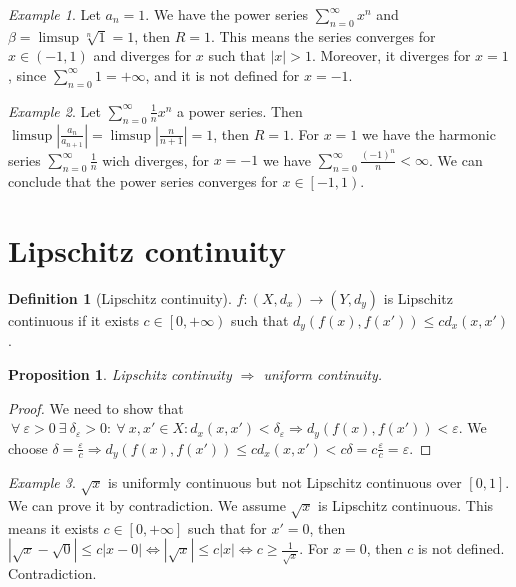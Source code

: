 \documentclass{article}
\newcommand{\DS}{\displaystyle}
\newcommand{\abs}[1]{\left|#1\right|}
\newcommand{\Ar}{\Rightarrow}
\newcommand{\f}[3]{#1 : #2 \rightarrow #3}
\newcommand{\intcc}[1]{\left[#1\right]}
\newcommand{\intco}[1]{\left[#1\right)}
\newcommand{\intoo}[1]{\left(#1\right)}
\theoremstyle{definition}
\newtheorem{definition}{Definition}[section]
\theoremstyle{definition}
\theoremstyle{plain}
\theoremstyle{plain}
\theoremstyle{plain}
\theoremstyle{plain}
\newtheorem{proposition}[theorem]{Proposition}
\theoremstyle{definition}
\theoremstyle{remark}
\theoremstyle{remark}
\theoremstyle{remark}
\newtheorem{examplet}{Example}[theorem]
\theoremstyle{remark}
\newcommand{\pseries}[1]{\sum_{n=0}^\infty #1}
\newcommand{\ForAll}{\ \forall \ }
\newcommand{\Exists}{\ \exists \ }
\newcommand{\E}{\varepsilon}
\begin{document}
\begin{examplet}
  Let $a_n = 1$. We have the power series $\DS \pseries{x^n}$ and $\beta = \limsup \sqrt[n]{1} = 1$, then $R = 1$. This means the series converges for $x \in \intoo{-1,1}$ and diverges for $x$ such that $|x| > 1$. Moreover, it diverges for $x = 1$, since $\DS \pseries{1} = +\infty$, and it is not defined for $x = -1$.
\end{examplet}

\begin{examplet}
  Let $\DS \pseries{\frac{1}{n}x^n}$ a power series. Then $\limsup \abs{\frac{a_n}{a_{n+1}}} = \limsup \abs{\frac{n}{n+1}} = 1$, then $R = 1$. For $x = 1$ we have the harmonic series $\DS \pseries{\frac{1}{n}}$ wich diverges, for $x = -1$ we have $\DS \pseries{\frac{(-1)^n}{n}} < \infty$. We can conclude that the power series converges for $x \in \intco{-1,1}$.
\end{examplet}


\newpage
\section{Lipschitz continuity}


\begin{definition}[Lipschitz continuity]
  $\f{f}{(X,d_x)}{(Y,d_y)}$ is Lipschitz continuous if it exists $c \in \intco{0,+\infty}$ such that $d_y(f(x),f(x')) \leq c d_x(x,x')$.
\end{definition}


\begin{proposition}
  Lipschitz continuity $\Ar$ uniform continuity.
\end{proposition}

\begin{proof}
  We need to show that $\ForAll \E > 0 \Exists \delta_\E > 0 : \ForAll x, x' \in X : d_x(x,x') < \delta_\E \Ar d_y(f(x),f(x')) < \E$. We choose $\delta = \frac{\E}{c} \Ar d_y(f(x),f(x')) \leq c d_x(x,x') < c \delta = c \frac{\E}{c} = \E$.
\end{proof}

\begin{examplet}
  $\sqrt{x}$ is uniformly continuous but not Lipschitz continuous over $\intcc{0,1}$. We can prove it by contradiction. We assume $\sqrt{x}$ is Lipschitz continuous. This means it exists $c \in \intcc{0,+\infty}$ such that for $x' = 0$, then $|\sqrt{x} - \sqrt{0}| \leq c |x - 0| \iff |\sqrt{x}| \leq c |x| \iff c \geq \frac{1}{\sqrt{x}}$. For $x = 0$, then $c$ is not defined. Contradiction.
\end{examplet}
\end{document}
